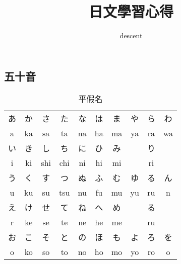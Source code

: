 \documentclass[12pt]{article}
\begin{document}
\begin{CJK}{UTF8}{cybercjk}
\title{日文學習心得}
\author{descent}
\maketitle
\newpage

\renewcommand{\contentsname}{目錄}
\renewcommand{\tablename}{表}
\renewcommand{\figurename}{圖}
\renewcommand{\listtablename}{表格目錄}
\renewcommand{\listfigurename}{圖目錄}

\tableofcontents
\newpage


\section{五十音}

\begin{table}[htdp]
\caption{平假名}
\begin{tabular}{cccccccccc}
\hline
あ& か & さ & た & な & は & ま & や & ら & わ\\
a & ka & sa & ta & na & ha & ma& ya & ra & wa\\
\hline
い & き & し & ち & に & ひ & み & & り& \\
i & ki & shi & chi & ni & hi & mi & & ri& \\
\hline
う & く  & す & つ & ぬ & ふ & む & ゆ & る & ん\\	
 u & ku &  su &  tsu &  nu &  fu &  mu &  yu &  ru & n\\	
\hline
え & け & せ & て & ね & へ & め & & る & \\	
 r & ke &  se &  te &  ne &  he &  me & &  ru & \\	
\hline
お & こ  & そ & と & の & ほ & も & よ & ろ & を\\	
 o &  ko &  so &  to &  no &  ho &  mo &  yo &  ro & o\\	

\hline
\end{tabular}
\end{table}



\end{CJK}
\end{document}
